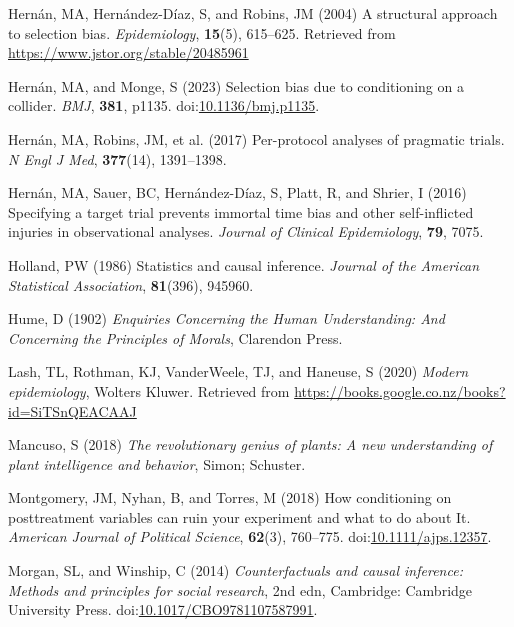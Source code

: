 \documentclass[
  singlecolumn]{article}
\newlength{\cslhangindent}
\newenvironment{CSLReferences}[2] %
 {\begin{list}{}{%
  \setlength{\itemindent}{0pt}
  \setlength{\leftmargin}{0pt}
  \setlength{\parsep}{0pt}
  \ifodd #1
   \setlength{\leftmargin}{\cslhangindent}
   \setlength{\itemindent}{-1\cslhangindent}
  \fi
  \setlength{\itemsep}{#2\baselineskip}}}
 {\end{list}}
\begin{document}
\begin{CSLReferences}{1}{0}
Hernán, MA, Hernández-Díaz, S, and Robins, JM (2004) A structural
approach to selection bias. \emph{Epidemiology}, \textbf{15}(5),
615--625. Retrieved from \url{https://www.jstor.org/stable/20485961}

Hernán, MA, and Monge, S (2023) Selection bias due to conditioning on a
collider. \emph{BMJ}, \textbf{381}, p1135.
doi:\href{https://doi.org/10.1136/bmj.p1135}{10.1136/bmj.p1135}.

Hernán, MA, Robins, JM, et al. (2017) Per-protocol analyses of pragmatic
trials. \emph{N Engl J Med}, \textbf{377}(14), 1391--1398.

Hernán, MA, Sauer, BC, Hernández-Díaz, S, Platt, R, and Shrier, I (2016)
Specifying a target trial prevents immortal time bias and other
self-inflicted injuries in observational analyses. \emph{Journal of
Clinical Epidemiology}, \textbf{79}, 7075.

Holland, PW (1986) Statistics and causal inference. \emph{Journal of the
American Statistical Association}, \textbf{81}(396), 945960.

Hume, D (1902) \emph{Enquiries Concerning the Human Understanding: And
Concerning the Principles of Morals}, Clarendon Press.

Lash, TL, Rothman, KJ, VanderWeele, TJ, and Haneuse, S (2020)
\emph{Modern epidemiology}, Wolters Kluwer. Retrieved from
\url{https://books.google.co.nz/books?id=SiTSnQEACAAJ}

Mancuso, S (2018) \emph{The revolutionary genius of plants: A new
understanding of plant intelligence and behavior}, Simon; Schuster.

Montgomery, JM, Nyhan, B, and Torres, M (2018) How conditioning on
posttreatment variables can ruin your experiment and what to do about
It. \emph{American Journal of Political Science}, \textbf{62}(3),
760--775.
doi:\href{https://doi.org/10.1111/ajps.12357}{10.1111/ajps.12357}.

Morgan, SL, and Winship, C (2014) \emph{Counterfactuals and causal
inference: Methods and principles for social research}, 2nd edn,
Cambridge: Cambridge University Press.
doi:\href{https://doi.org/10.1017/CBO9781107587991}{10.1017/CBO9781107587991}.


\end{CSLReferences}
\end{document}

